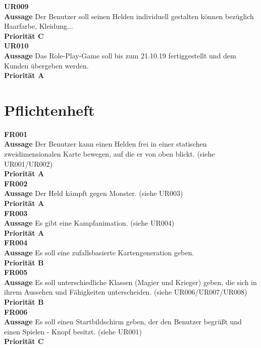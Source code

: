 \textbf{UR009} \\
\textbf{Aussage} Der Benutzer soll seinen Helden individuell gestalten können bezüglich Haarfarbe, Kleidung... \\
\textbf{Priorität C} \\

\textbf{UR010} \\
\textbf{Aussage} Das Role-Play-Game soll bis zum 21.10.19 fertiggestellt und dem Kunden übergeben werden.\\
\textbf{Priorität A}

\newpage

\section{Pflichtenheft}
\label{Pflichtenheft}

\textbf{FR001} \\
\textbf{Aussage} Der Benutzer kann einen Helden frei in einer statischen zweidimensionalen Karte bewegen, auf die er von oben blickt. (siehe UR001/UR002) \\
\textbf{Priorität A} \\

\textbf{FR002} \\
\textbf{Aussage} Der Held kämpft gegen Monster. (siehe UR003) \\
\textbf{Priorität A} \\

\textbf{FR003} \\
\textbf{Aussage} Es gibt eine Kampfanimation. (siehe UR004) \\
\textbf{Priorität A} \\

\textbf{FR004} \\
\textbf{Aussage} Es soll eine zufallsbasierte Kartengeneration geben. \\
\textbf{Priorität B} \\

\textbf{FR005} \\
\textbf{Aussage} Es soll unterschiedliche Klassen (Magier und Krieger) geben, die sich in ihrem Aussehen und Fähigkeiten unterscheiden. (siehe UR006/UR007/UR008) \\
\textbf{Priorität B} \\

\textbf{FR006} \\
\textbf{Aussage} Es soll einen Startbildschirm geben, der den Benutzer begrüßt und einen \glqq{}Spielen\grqq{} - Knopf besitzt. (siehe UR001) \\
\textbf{Priorität C} \\

